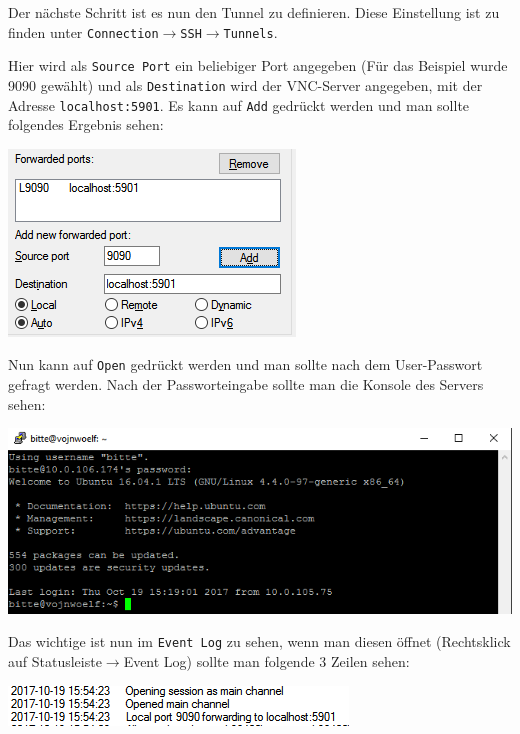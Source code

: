 Der nächste Schritt ist es nun den Tunnel zu definieren. Diese Einstellung ist zu finden unter \verb|Connection|$\rightarrow$\verb|SSH|$\rightarrow$\verb|Tunnels|.

Hier wird als \verb|Source Port| ein beliebiger Port angegeben (Für das Beispiel wurde 9090 gewählt) und als \verb|Destination| wird der VNC-Server angegeben, mit der Adresse \verb|localhost:5901|. Es kann auf \verb|Add| gedrückt werden und man sollte folgendes Ergebnis sehen:

\begin{minipage}{\linewidth}
	\centering
	\includegraphics[width=0.8\linewidth]{images/ports}
\end{minipage}

Nun kann auf \verb|Open| gedrückt werden und man sollte nach dem User-Passwort gefragt werden. Nach der Passworteingabe sollte man die Konsole des Servers sehen:

\begin{minipage}{\linewidth}
	\centering
	\includegraphics[width=0.8\linewidth]{images/console}
\end{minipage}

Das wichtige ist nun im \verb|Event Log| zu sehen, wenn man diesen öffnet (Rechtsklick auf Statusleiste$\rightarrow$Event Log) sollte man folgende 3 Zeilen sehen:

\begin{minipage}{\linewidth}
	\centering
	\includegraphics[width=0.8\linewidth]{images/event_log}
\end{minipage}

